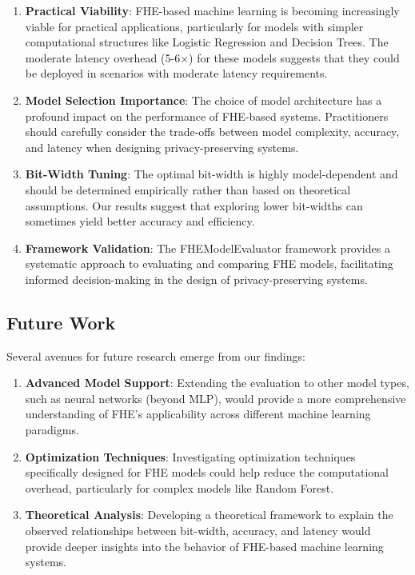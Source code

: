 \documentclass[a4paper,12pt]{article}
\begin{document}
\begin{enumerate}
    \item \textbf{Practical Viability}: FHE-based machine learning is becoming increasingly viable for practical applications, particularly for models with simpler computational structures like Logistic Regression and Decision Trees. The moderate latency overhead (5-6×) for these models suggests that they could be deployed in scenarios with moderate latency requirements.
    
    \item \textbf{Model Selection Importance}: The choice of model architecture has a profound impact on the performance of FHE-based systems. Practitioners should carefully consider the trade-offs between model complexity, accuracy, and latency when designing privacy-preserving systems.
    
    \item \textbf{Bit-Width Tuning}: The optimal bit-width is highly model-dependent and should be determined empirically rather than based on theoretical assumptions. Our results suggest that exploring lower bit-widths can sometimes yield better accuracy and efficiency.
    
    \item \textbf{Framework Validation}: The FHEModelEvaluator framework provides a systematic approach to evaluating and comparing FHE models, facilitating informed decision-making in the design of privacy-preserving systems.
\end{enumerate}

\subsection{Future Work}

Several avenues for future research emerge from our findings:

\begin{enumerate}    f
    \item \textbf{Advanced Model Support}: Extending the evaluation to other model types, such as neural networks (beyond MLP), would provide a more comprehensive understanding of FHE's applicability across different machine learning paradigms.
    
    \item \textbf{Optimization Techniques}: Investigating optimization techniques specifically designed for FHE models could help reduce the computational overhead, particularly for complex models like Random Forest.
    
    \item \textbf{Theoretical Analysis}: Developing a theoretical framework to explain the observed relationships between bit-width, accuracy, and latency would provide deeper insights into the behavior of FHE-based machine learning systems.
\end{enumerate}
\end{document}
